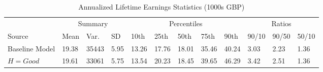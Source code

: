 \documentclass[border=3mm,preview]{standalone}\usepackage{booktabs}
\begin{document}
\begin{landscape}
\small
\begin{table} 
\center\caption*{Annualized Lifetime Earnings Statistics (1000s GBP)} 
\begin{tabular}{l | l l l | l l l l l | l l l} 
\toprule 
 & \multicolumn{3}{c}{Summary} & \multicolumn{5}{c}{Percentiles} & \multicolumn{3}{c}{Ratios} \\ 
Source & Mean & Var. & SD & 10th & 25th & 50th & 75th & 90th & 90/10 & 90/50 & 50/10 \\ 
\midrule 
Baseline Model & 19.38 & 35443 & 5.95 & 
        13.26 & 17.76 & 18.01 & 35.46 & 40.24 &
        3.03 & 2.23 & 1.36 \\ 
$H = Good$ & 19.61 & 33061 & 5.75 & 
        13.54 & 20.23 & 18.45 & 39.65 & 46.29 &
        3.42 & 2.51 
        & 1.36 \\ 
\bottomrule 
\end{tabular}
\end{table}
\end{landscape}
\end{document}
